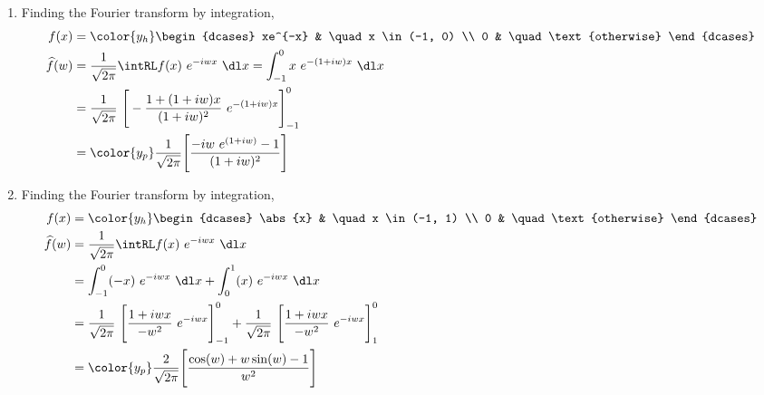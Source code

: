 \begin{enumerate}
    \item Finding the Fourier transform by integration,
          \begin{align}
              f(x)           & = \color{y_h}\begin{dcases}
                                                xe^{-x} & \quad x \in (-1, 0)    \\
                                                0       & \quad \text{otherwise}
                                            \end{dcases}        \\
              \widehat{f}(w) & = \frac{1}{\sqrt{2\pi}} \intRL f(x)\ e^{-iwx}\ \dl x
              = \int_{-1}^{0} x\ e^{-(1 + iw)x}\ \dl x                              \\
                             & = \frac{1}{\sqrt{2\pi}}\ \Bigg[ -\frac{1 + (1+iw)x}
              {(1+iw)^2}\ e^{-(1+iw)x} \Bigg]_{-1}^{0}                              \\
                             & = \color{y_p} \frac{1}{\sqrt{2\pi}} \Bigg[
                  \frac{-iw\ e^{(1+iw)} - 1}{(1+iw)^2} \Bigg]
          \end{align}

    \item Finding the Fourier transform by integration,
          \begin{align}
              f(x)           & = \color{y_h}\begin{dcases}
                                                \abs{x} & \quad x \in (-1, 1)    \\
                                                0       & \quad \text{otherwise}
                                            \end{dcases}        \\
              \widehat{f}(w) & = \frac{1}{\sqrt{2\pi}} \intRL f(x)\ e^{-iwx}\ \dl x \\
                             & = \int_{-1}^{0} (-x)\ e^{-iwx}\ \dl x
              + \int_{0}^{1} (x)\ e^{-iwx}\ \dl x                                   \\
                             & = \frac{1}{\sqrt{2\pi}}\ \Bigg[ \frac{1 + iwx}
                  {-w^2}\ e^{-iwx} \Bigg]_{-1}^{0} + \frac{1}{\sqrt{2\pi}}\ \Bigg[
              \frac{1 + iwx}{-w^2}\ e^{-iwx} \Bigg]_{1}^{0}                         \\
                             & = \color{y_p} \frac{2}{\sqrt{2\pi}} \Bigg[
                  \frac{\cos(w) + w\sin(w) - 1}{w^2} \Bigg]
          \end{align}


\end{enumerate}
